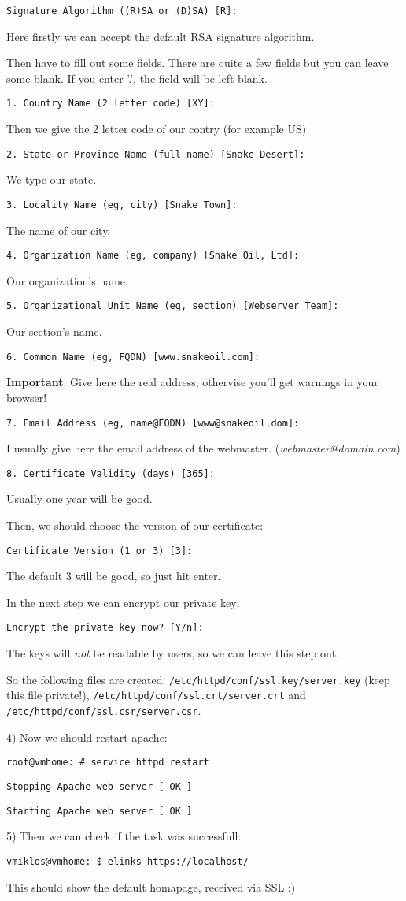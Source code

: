 {\tt Signature Algorithm ((R)SA or (D)SA) [R]:}

Here firstly we can accept the default RSA signature algorithm.

Then have to fill out some fields. There are quite a few fields but you can leave some blank.
If you enter '.', the field will be left blank.

{\tt 1. Country Name             (2 letter code) [XY]:}

Then we give the 2 letter code of our contry (for example US)

{\tt 2. State or Province Name   (full name)     [Snake Desert]:}

We type our state.

{\tt 3. Locality Name            (eg, city)      [Snake Town]:}

The name of our city.

{\tt 4. Organization Name        (eg, company)   [Snake Oil, Ltd]:}

Our organization's name.

{\tt 5. Organizational Unit Name (eg, section)   [Webserver Team]:}

Our section's name.

{\tt 6. Common Name              (eg, FQDN)      [www.snakeoil.com]:}

\textbf{Important}: Give here the real address, othervise you'll get warnings in your browser!

{\tt 7. Email Address            (eg, name@FQDN) [www@snakeoil.dom]:}

I usually give here the email address of the webmaster. (\textit{webmaster@domain.com})

{\tt 8. Certificate Validity     (days)          [365]:}

Usually one year will be good.

Then, we should choose the version of our certificate:

{\tt Certificate Version (1 or 3) [3]:}

The default 3 will be good, so just hit enter.

In the next step we can encrypt our private key:

{\tt Encrypt the private key now? [Y/n]:}

The keys will \textit{not} be readable by users, so we can leave this step out.

So the following files are created: {\tt /etc/httpd/conf/ssl.key/server.key} (keep this file private!), {\tt /etc/httpd/conf/ssl.crt/server.crt} and {\tt /etc/httpd/conf/ssl.csr/server.csr}.

4) Now we should restart apache:

{\tt root@vmhome:~# service httpd restart}

{\tt Stopping Apache web server [  OK  ]}

{\tt Starting Apache web server [  OK  ]}

5) Then we can check if the task was successfull:

{\tt vmiklos@vmhome:~\$ elinks https://localhost/}

This should show the default homapage, received via SSL :)
